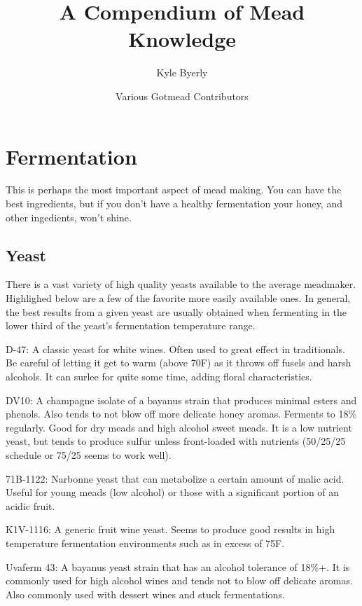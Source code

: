 \documentclass{article}
\title{A Compendium of Mead Knowledge}
\author{
  Kyle Byerly\\
 \and
  Various Gotmead Contributors\\
}
\begin{document}
\maketitle
\newpage

\tableofcontents
\newpage

\section{Fermentation}
 This is perhaps the most important aspect of mead making. You can have the best ingredients, but if you don't have a healthy fermentation your honey, and other ingedients, won't shine.
 \subsection{Yeast}
  There is a vast variety of high quality yeasts available to the average meadmaker. Highlighed below are a few of the favorite more easily available ones.
  In general, the best results from a given yeast are usually obtained when fermenting in the lower third of the yeast's fermentation temperature range.

  D-47: A classic yeast for white wines. Often used to great effect in traditionals. Be careful of letting it get to warm (above 70F) as it throws off fusels and harsh alcohols. It can surlee for quite some time, adding floral characteristics.

  DV10: A champagne isolate of a bayanus strain that produces minimal esters and phenols. Also tends to not blow off more delicate honey aromas. 
  Ferments to 18\% regularly. Good for dry meads and high alcohol sweet meads. It is a low nutrient yeast, but tends to produce sulfur unless 
  front-loaded with nutrients (50/25/25 schedule or 75/25 seems to work well).

  71B-1122: Narbonne yeast that can metabolize a certain amount of malic acid. Useful for young meads (low alcohol) or those with a 
  significant portion of an acidic fruit.

  K1V-1116: A generic fruit wine yeast. Seems to produce good results in high temperature fermentation environments such as in excess of 75F.

  Uvaferm 43: A bayanus yeast strain that has an alcohol tolerance of 18\%+. It is commonly used for high alcohol wines and tends not to blow off 
  delicate aromas. Also commonly used with dessert wines and stuck fermentations. 
\end{document}
